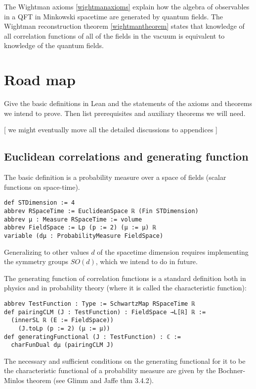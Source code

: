 \documentclass{article}
\newcommand{\1}{\mathbbm{1}}
\theoremstyle{plain}
\theoremstyle{definition}
\numberwithin{equation}{section}
\begin{document}
The Wightman axioms \ref{wightmanaxioms} explain how the algebra of observables in a QFT in Minkowski spacetime are generated by quantum fields. The Wightman reconstruction theorem \ref{wightmantheorem} states that knowledge of all correlation functions of all of the fields in the vacuum is equivalent to knowledge of the quantum fields. 
\fi




\section{Road map}

Give the basic definitions in Lean and the statements of the axioms and theorems we intend to prove.
Then list prerequisites and auxiliary theorems we will need.

[ we might eventually move all the detailed discussions to appendices ]

\subsection{Euclidean correlations and generating function}

The basic definition is a probability measure over a space of fields (scalar functions
on space-time).
\begin{lstlisting}
def STDimension := 4
abbrev RSpaceTime := EuclideanSpace ℝ (Fin STDimension)
abbrev μ : Measure RSpaceTime := volume
abbrev FieldSpace := Lp (p := 2) (μ := μ) ℝ
variable (dμ : ProbabilityMeasure FieldSpace)
\end{lstlisting}
Generalizing to other values $d$ of the spacetime dimension requires implementing
the symmetry groups $SO(d)$, which we intend to do in future.

The generating function of correlation functions is a standard definition both in physics
and in probability theory (where it is called the characteristic function):
\begin{lstlisting}
abbrev TestFunction : Type := SchwartzMap RSpaceTime ℝ
def pairingCLM (J : TestFunction) : FieldSpace →L[ℝ] ℝ :=
  (innerSL ℝ (E := FieldSpace))
    (J.toLp (p := 2) (μ := μ))
def generatingFunctional (J : TestFunction) : ℂ :=
  charFunDual dμ (pairingCLM J)
\end{lstlisting}

The necessary and sufficient conditions on the generating functional for it to be
the characteristic functional of a probability measure  are given by the Bochner-Minlos theorem
(see Glimm and Jaffe thm 3.4.2).
\end{document}
